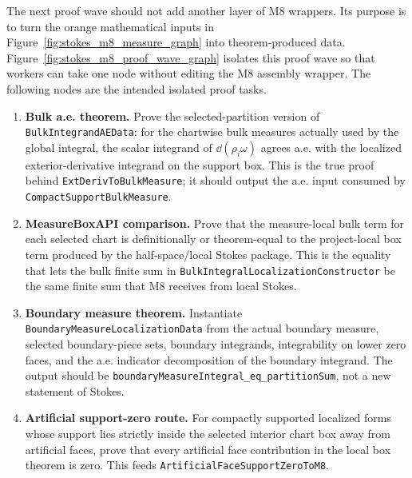 \begin{proposition}
  \label{anc:m8_proof_wave_true_nodes}
  \begingroup\raggedright
  The next proof wave should not add another layer of M8 wrappers.  Its purpose
  is to turn the orange mathematical inputs in
  Figure~\ref{fig:stokes_m8_measure_graph} into theorem-produced data.
  Figure~\ref{fig:stokes_m8_proof_wave_graph} isolates this proof wave so that
  workers can take one node without editing the M8 assembly wrapper.  The
  following nodes are the intended isolated proof tasks.

  \begin{enumerate}
    \item \textbf{Bulk a.e. theorem.}  Prove the selected-partition version of
      \texttt{BulkIntegrandAEData}: for the chartwise bulk measures actually
      used by the global integral, the scalar integrand of
      \(\dd(\rho_i\omega)\) agrees a.e. with the localized exterior-derivative
      integrand on the support box.  This is the true proof behind
      \texttt{ExtDerivToBulkMeasure}; it should output the a.e. input consumed
      by \texttt{CompactSupportBulkMeasure}.

    \item \textbf{MeasureBoxAPI comparison.}  Prove that the measure-local bulk
      term for each selected chart is definitionally or theorem-equal to the
      project-local box term produced by the half-space/local Stokes package.
      This is the equality that lets the bulk finite sum in
      \texttt{BulkIntegralLocalizationConstructor} be the same finite sum that
      M8 receives from local Stokes.

    \item \textbf{Boundary measure theorem.}  Instantiate
      \texttt{BoundaryMeasureLocalizationData} from the actual boundary measure,
      selected boundary-piece sets, boundary integrands, integrability on lower
      zero faces, and the a.e. indicator decomposition of the boundary
      integrand.  The output should be
      \texttt{boundaryMeasureIntegral\_eq\_partitionSum}, not a new statement
      of Stokes.

    \item \textbf{Artificial support-zero route.}  For compactly supported
      localized forms whose support lies strictly inside the selected interior
      chart box away from artificial faces, prove that every artificial face
      contribution in the local box theorem is zero.  This feeds
      \texttt{ArtificialFaceSupportZeroToM8}.


\end{enumerate}
\end{proposition}
